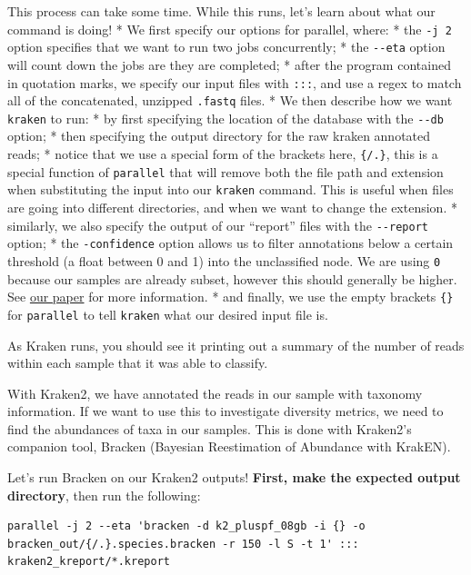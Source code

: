 \documentclass[
]{book}
\begin{document}
This process can take some time. While this runs, let's learn about what our command is doing!
* We first specify our options for parallel, where:
* the \texttt{-j\ 2} option specifies that we want to run two jobs concurrently;
* the \texttt{-\/-eta} option will count down the jobs are they are completed;
* after the program contained in quotation marks, we specify our input files with \texttt{:::}, and use a regex to match all of the concatenated, unzipped \texttt{.fastq} files.
* We then describe how we want \texttt{kraken} to run:
* by first specifying the location of the database with the \texttt{-\/-db} option;
* then specifying the output directory for the raw kraken annotated reads;
* notice that we use a special form of the brackets here, \texttt{\{/.\}}, this is a special function of \texttt{parallel} that will remove both the file path and extension when substituting the input into our \texttt{kraken} command. This is useful when files are going into different directories, and when we want to change the extension.
* similarly, we also specify the output of our ``report'' files with the \texttt{-\/-report} option;
* the \texttt{-confidence} option allows us to filter annotations below a certain threshold (a float between 0 and 1) into the unclassified node. We are using \texttt{0} because our samples are already subset, however this should generally be higher. See \href{https://www.microbiologyresearch.org/content/journal/mgen/10.1099/mgen.0.000949}{our paper} for more information.
* and finally, we use the empty brackets \texttt{\{\}} for \texttt{parallel} to tell \texttt{kraken} what our desired input file is.

As Kraken runs, you should see it printing out a summary of the number of reads within each sample that it was able to classify.

With Kraken2, we have annotated the reads in our sample with taxonomy information. If we want to use this to investigate diversity metrics, we need to find the abundances of taxa in our samples. This is done with Kraken2's companion tool, Bracken (Bayesian Reestimation of Abundance with KrakEN).

Let's run Bracken on our Kraken2 outputs! \textbf{First, make the expected output directory}, then run the following:

\begin{verbatim}
parallel -j 2 --eta 'bracken -d k2_pluspf_08gb -i {} -o bracken_out/{/.}.species.bracken -r 150 -l S -t 1' ::: kraken2_kreport/*.kreport
\end{verbatim}
\end{document}
